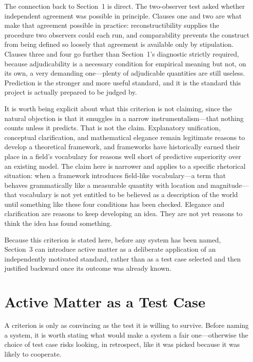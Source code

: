 \documentclass[11pt]{article}
\begin{document}
The connection back to Section~1 is direct. The two-observer test asked whether independent agreement was possible in principle. Clauses one and two are what make that agreement possible in practice: reconstructibility supplies the procedure two observers could each run, and comparability prevents the construct from being defined so loosely that agreement is available only by stipulation. Clauses three and four go further than Section~1's diagnostic strictly required, because adjudicability is a necessary condition for empirical meaning but not, on its own, a very demanding one---plenty of adjudicable quantities are still useless. Prediction is the stronger and more useful standard, and it is the standard this project is actually prepared to be judged by.

It is worth being explicit about what this criterion is not claiming, since the natural objection is that it smuggles in a narrow instrumentalism---that nothing counts unless it predicts. That is not the claim. Explanatory unification, conceptual clarification, and mathematical elegance remain legitimate reasons to develop a theoretical framework, and frameworks have historically earned their place in a field's vocabulary for reasons well short of predictive superiority over an existing model. The claim here is narrower and applies to a specific rhetorical situation: when a framework introduces field-like vocabulary---a term that behaves grammatically like a measurable quantity with location and magnitude---that vocabulary is not yet entitled to be believed as a description of the world until something like these four conditions has been checked. Elegance and clarification are reasons to keep developing an idea. They are not yet reasons to think the idea has found something.

Because this criterion is stated here, before any system has been named, Section~3 can introduce active matter as a deliberate application of an independently motivated standard, rather than as a test case selected and then justified backward once its outcome was already known.

\section{Active Matter as a Test Case}

A criterion is only as convincing as the test it is willing to survive. Before naming a system, it is worth stating what would make a system a fair one---otherwise the choice of test case risks looking, in retrospect, like it was picked because it was likely to cooperate.
\end{document}
